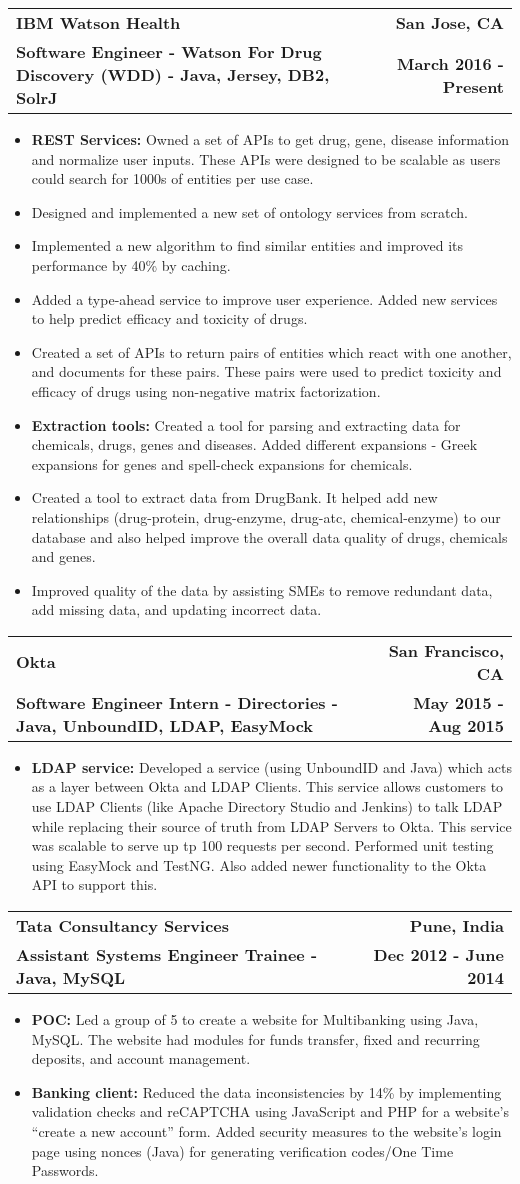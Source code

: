\documentclass[letterpaper,10.9pt]{article}
\makeatletter
\newcommand{\resumeItem}[2]{
  \item\small{
    \textbf{#1}{#2 \vspace{-2pt}}
  }
}
\newcommand{\resumeSubheading}[4]{
  \vspace{-1pt}\item
    \begin{tabular*}{0.97\textwidth}{l@{\extracolsep{\fill}}r}
      \textbf{#1} & \textbf{#2} \\
      \textbf{\small#3} & \textbf{\small #4} \\
    \end{tabular*}\vspace{-5pt}
}
\newcommand{\resumeItemListStart}{\begin{itemize}}
\newcommand{\resumeItemListEnd}{\end{itemize}\vspace{-5pt}}
\makeatother
\begin{document}
    \resumeSubheading
      {IBM Watson Health}{San Jose, CA}
      {Software Engineer - Watson For Drug Discovery (WDD) - Java, Jersey, DB2, SolrJ }{March 2016 - Present}
      \resumeItemListStart
        \resumeItem{REST Services: }{Owned a set of APIs to get drug, gene, disease information and normalize user inputs. These APIs were designed to be scalable as users could search for 1000s of entities per use case.}
        \resumeItem{}{Designed and implemented a new set of ontology services from scratch.} 
        \resumeItem{}{Implemented a new algorithm to find similar entities and improved its performance by 40\% by caching. }
        \resumeItem{}{Added a type-ahead service to improve user experience. Added new services to help predict efficacy and toxicity of drugs. }
        \resumeItem{}{Created a set of APIs to return pairs of entities which react with one another, and documents for these pairs. These pairs were used to predict toxicity and efficacy of drugs using non-negative matrix factorization.}
        \resumeItem{Extraction tools: }{Created a tool for parsing and extracting data for chemicals, drugs, genes and diseases. Added different expansions - Greek expansions for genes and spell-check expansions for chemicals.}
        \resumeItem{}{Created a tool to extract data from DrugBank. It helped add new relationships (drug-protein, drug-enzyme, drug-atc, chemical-enzyme) to our database and also helped improve the overall data quality of drugs, chemicals and genes.}
        \resumeItem{}{Improved quality of the data by assisting SMEs to remove redundant data, add missing data, and updating incorrect data.}
      \resumeItemListEnd

    \resumeSubheading
      {Okta}{San Francisco, CA}
      {Software Engineer Intern - Directories - Java, UnboundID, LDAP, EasyMock}{May 2015 - Aug 2015}
      \resumeItemListStart
        \resumeItem{LDAP service: }
          {Developed a service (using UnboundID and Java) which acts as a layer between Okta and LDAP Clients. This service allows customers to use LDAP Clients (like Apache Directory Studio and Jenkins) to talk LDAP while replacing their source of truth from LDAP Servers to Okta. This service was scalable to serve up tp 100 requests per second. Performed unit testing using EasyMock and TestNG. Also added newer functionality to the Okta API to support this.}
      \resumeItemListEnd

    \resumeSubheading
      {Tata Consultancy Services}{Pune, India}
      {Assistant Systems Engineer Trainee - Java, MySQL}{Dec 2012 - June 2014}
      \resumeItemListStart
        \resumeItem{POC: } {Led a group of 5 to create a website for Multibanking using Java, MySQL. The website had modules for funds transfer, fixed and recurring deposits, and account management.}
        \resumeItem{Banking client: } {Reduced the data inconsistencies by 14\% by implementing validation checks and reCAPTCHA using JavaScript and PHP for a website’s “create a new account” form. Added security measures to the website’s login page using nonces (Java) for generating verification codes/One Time Passwords.}
      \resumeItemListEnd
\end{document}
